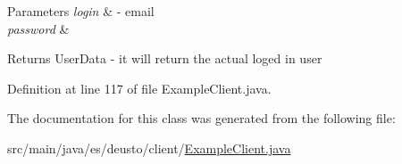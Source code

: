 \begin{DoxyParams}{Parameters}
{\em login} & -\/ email \\
\hline
{\em password} & \\
\hline
\end{DoxyParams}
\begin{DoxyReturn}{Returns}
User\+Data -\/ it will return the actual loged in user 
\end{DoxyReturn}


Definition at line 117 of file Example\+Client.\+java.



The documentation for this class was generated from the following file\+:\begin{DoxyCompactItemize}
\item 
src/main/java/es/deusto/client/\hyperlink{_example_client_8java}{Example\+Client.\+java}\end{DoxyCompactItemize}
